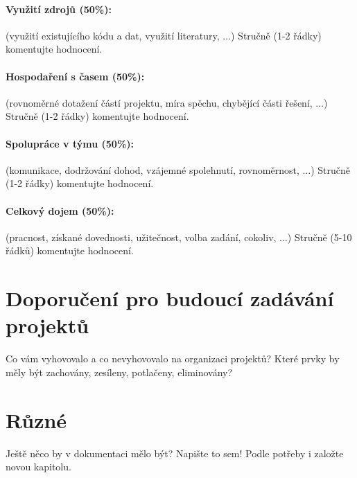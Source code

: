 \documentclass[11pt,a4paper]{article}
\begin{document}
\paragraph{Využití zdrojů (50\%):} (využití existujícího kódu a dat, využití
literatury, $\ldots$)
Stručně (1-2 řádky) komentujte hodnocení. 

\paragraph{Hospodaření s časem (50\%):} (rovnoměrné dotažení částí projektu,
míra spěchu, chybějící části řešení, $\ldots$)
Stručně (1-2 řádky) komentujte hodnocení. 

\paragraph{Spolupráce v týmu (50\%):} (komunikace, dodržování dohod, vzájemné
spolehnutí, rovnoměrnost, $\ldots$)
Stručně (1-2 řádky) komentujte hodnocení. 

\paragraph{Celkový dojem (50\%):} (pracnost, získané dovednosti, užitečnost,
volba zadání, cokoliv, $\ldots$)
Stručně (5-10 řádků) komentujte hodnocení. 

\section{Doporučení pro budoucí zadávání projektů}

Co vám vyhovovalo a co nevyhovovalo na organizaci projektů? Které prvky by měly
být zachovány, zesíleny, potlačeny, eliminovány?

\section{Různé}

Ještě něco by v dokumentaci mělo být? Napište to sem! Podle potřeby i založte
novou kapitolu.
\end{document}
